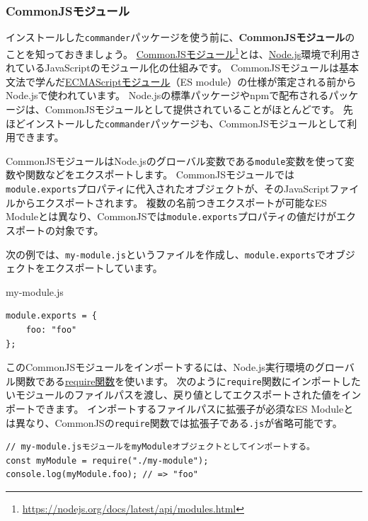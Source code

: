 \hypertarget{commonjs-module}{%
\subsubsection{CommonJSモジュール}\label{commonjs-module}}

インストールした\texttt{commander}パッケージを使う前に、\textbf{CommonJSモジュール}のことを知っておきましょう。
\href{https://nodejs.org/docs/latest/api/modules.html}{CommonJSモジュール}\footnote{\url{https://nodejs.org/docs/latest/api/modules.html}}とは、\href{https://nodejs.org/ja/}{Node.js}環境で利用されているJavaScriptのモジュール化の仕組みです。
CommonJSモジュールは基本文法で学んだ\hyperlink{module}{ECMAScriptモジュール}（ES module）の仕様が策定される前からNode.jsで使われています。
Node.jsの標準パッケージやnpmで配布されるパッケージは、CommonJSモジュールとして提供されていることがほとんどです。
先ほどインストールした\texttt{commander}パッケージも、CommonJSモジュールとして利用できます。

CommonJSモジュールはNode.jsのグローバル変数である\texttt{module}変数を使って変数や関数などをエクスポートします。
CommonJSモジュールでは\texttt{module.exports}プロパティに代入されたオブジェクトが、そのJavaScriptファイルからエクスポートされます。
複数の名前つきエクスポートが可能なES
Moduleとは異なり、CommonJSでは\texttt{module.exports}プロパティの値だけがエクスポートの対象です。

次の例では、\texttt{my-module.js}というファイルを作成し、\texttt{module.exports}でオブジェクトをエクスポートしています。

\begin{listtitle}
my-module.js
\end{listtitle}
\begin{lstlisting}
module.exports = {
    foo: "foo"
};
\end{lstlisting}
\listend

このCommonJSモジュールをインポートするには、Node.js実行環境のグローバル関数である\href{https://nodejs.org/dist/latest-v12.x/docs/api/modules.html\#modules_loading_from_node_modules_folders}{require関数}を使います。
次のように\texttt{require}関数にインポートしたいモジュールのファイルパスを渡し、戻り値としてエクスポートされた値をインポートできます。
インポートするファイルパスに拡張子が必須なES
Moduleとは異なり、CommonJSの\texttt{require}関数では拡張子である\texttt{.js}が省略可能です。

\begin{lstlisting}
// my-module.jsモジュールをmyModuleオブジェクトとしてインポートする。
const myModule = require("./my-module");
console.log(myModule.foo); // => "foo"
\end{lstlisting}

